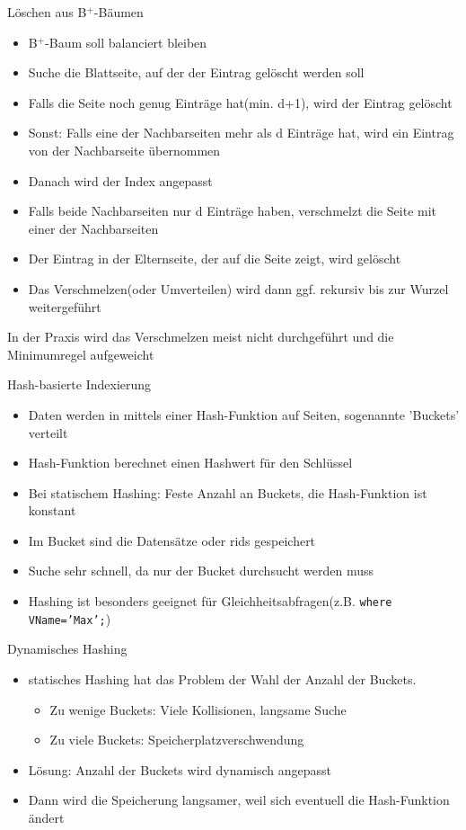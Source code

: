 \documentclass{article}
\begin{document}
\begin{block}{Löschen aus B$^+$-Bäumen}
  \begin{itemize}
    \item B$^+$-Baum soll balanciert bleiben
    \item Suche die Blattseite, auf der der Eintrag gelöscht werden soll
    \item Falls die Seite noch genug Einträge hat(min. d+1), wird der Eintrag gelöscht
    \item Sonst: Falls eine der Nachbarseiten mehr als d Einträge hat, wird ein Eintrag von der Nachbarseite übernommen
    \item Danach wird der Index angepasst
    \item Falls beide Nachbarseiten nur d Einträge haben, verschmelzt die Seite mit einer der Nachbarseiten
    \item Der Eintrag in der Elternseite, der auf die Seite zeigt, wird gelöscht
    \item Das Verschmelzen(oder Umverteilen) wird dann ggf. rekursiv bis zur Wurzel weitergeführt
  \end{itemize}
  In der Praxis wird das Verschmelzen meist nicht durchgeführt und die Minimumregel aufgeweicht
\end{block}

\begin{block}{Hash-basierte Indexierung}
  \begin{itemize}
    \item Daten werden in mittels einer Hash-Funktion auf Seiten, sogenannte 'Buckets' verteilt
    \item Hash-Funktion berechnet einen Hashwert für den Schlüssel
    \item Bei statischem Hashing: Feste Anzahl an Buckets, die Hash-Funktion ist konstant
    \item Im Bucket sind die Datensätze oder rids gespeichert
    \item Suche sehr schnell, da nur der Bucket durchsucht werden muss
    \item Hashing ist besonders geeignet für Gleichheitsabfragen(z.B. \texttt{where VName='Max';})
  \end{itemize}
\end{block}

\begin{block}{Dynamisches Hashing}
  \begin{itemize}
    \item statisches Hashing hat das Problem der Wahl der Anzahl der Buckets.
    \begin{itemize}
      \item Zu wenige Buckets: Viele Kollisionen, langsame Suche
      \item Zu viele Buckets: Speicherplatzverschwendung
    \end{itemize}
    \item Lösung: Anzahl der Buckets wird dynamisch angepasst
    \item Dann wird die Speicherung langsamer, weil sich eventuell die Hash-Funktion ändert
  \end{itemize}
\end{block}
\end{document}
